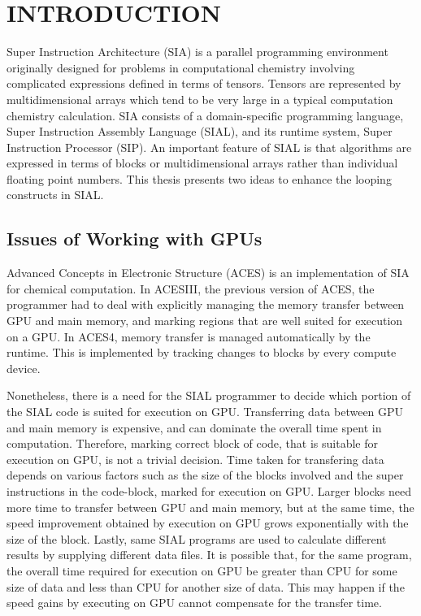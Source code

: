 \chapter{INTRODUCTION}\label{intro}
Super Instruction Architecture (SIA) is a parallel programming environment
originally designed for problems in computational chemistry involving complicated
expressions defined in terms of tensors. Tensors are represented by
multidimensional arrays which tend to be very large in a typical computation chemistry
calculation. SIA consists of a
domain-specific programming language, Super Instruction Assembly Language
(SIAL), and its runtime system, Super Instruction Processor (SIP). An important
feature of SIAL is that algorithms are expressed in terms of blocks or
multidimensional arrays rather than individual floating point numbers. This thesis
presents two ideas to enhance the looping constructs in SIAL.

\section{Issues of Working with GPUs}
Advanced Concepts in Electronic Structure (ACES) is an implementation of SIA for
chemical computation.
In ACESIII, the previous version of ACES, the programmer had to deal with explicitly managing
the memory transfer between GPU and main memory, and marking regions that are well suited for execution
on a GPU. In ACES4, memory transfer is managed automatically by the runtime.
This is implemented by tracking changes to blocks by every compute device.

Nonetheless, there is a need for the SIAL programmer to decide which portion of the SIAL code
is suited for execution on GPU. Transferring data between GPU and main memory is
expensive\cite{datatransferoptimization}, and can dominate the overall time spent in computation. Therefore, marking
correct block of code, that is suitable for execution on GPU, is not
a trivial decision. Time taken for transfering data depends on various factors such as
the size of the blocks involved and the super instructions in the code-block, marked
for execution on GPU.
Larger blocks need more time to transfer between GPU and main memory, but at the
same time, the speed improvement obtained by execution on GPU grows
exponentially with the size of the block. Lastly, same SIAL programs are used to
calculate different results by supplying different data files. It is possible that,
for the same program, the overall time required for execution on GPU be greater
than CPU for some size of data and less than CPU for another size of data.
This may happen if the speed gains by executing on GPU cannot compensate for the
transfer time.

